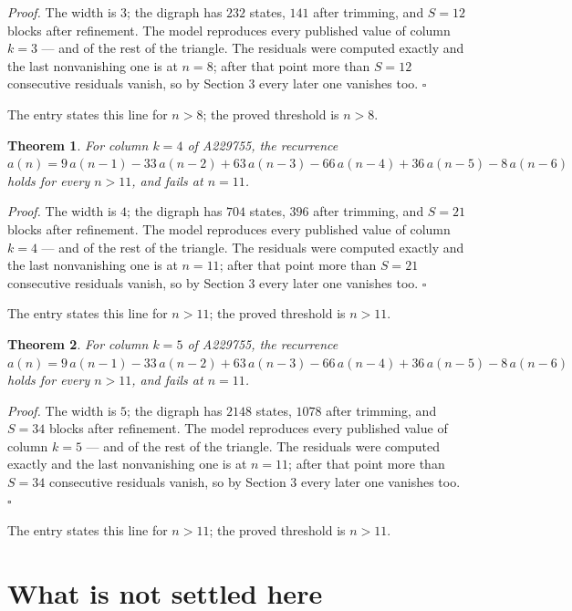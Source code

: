 \documentclass[11pt]{article}
\newtheorem{theorem}{Theorem}
\theoremstyle{definition}
\begin{document}
{\itshape Proof.} The width is $3$; the digraph has $232$ states, $141$ after trimming, and $S = 12$ blocks after refinement. The model reproduces every published value of column $k = 3$ --- and of the rest of the triangle. The residuals were computed exactly and the last nonvanishing one is at $n = 8$; after that point more than $S = 12$ consecutive residuals vanish, so by Section 3 every later one vanishes too. $\square$

The entry states this line for $n > 8$; the proved threshold is $n > 8$.

\begin{theorem} For column $k = 4$ of A229755, the recurrence $a(n) = 9\,a(n-1) - 33\,a(n-2) + 63\,a(n-3) - 66\,a(n-4) + 36\,a(n-5) - 8\,a(n-6)$ holds for every $n > 11$, and fails at $n = 11$.\end{theorem}

{\itshape Proof.} The width is $4$; the digraph has $704$ states, $396$ after trimming, and $S = 21$ blocks after refinement. The model reproduces every published value of column $k = 4$ --- and of the rest of the triangle. The residuals were computed exactly and the last nonvanishing one is at $n = 11$; after that point more than $S = 21$ consecutive residuals vanish, so by Section 3 every later one vanishes too. $\square$

The entry states this line for $n > 11$; the proved threshold is $n > 11$.

\begin{theorem} For column $k = 5$ of A229755, the recurrence $a(n) = 9\,a(n-1) - 33\,a(n-2) + 63\,a(n-3) - 66\,a(n-4) + 36\,a(n-5) - 8\,a(n-6)$ holds for every $n > 11$, and fails at $n = 11$.\end{theorem}

{\itshape Proof.} The width is $5$; the digraph has $2148$ states, $1078$ after trimming, and $S = 34$ blocks after refinement. The model reproduces every published value of column $k = 5$ --- and of the rest of the triangle. The residuals were computed exactly and the last nonvanishing one is at $n = 11$; after that point more than $S = 34$ consecutive residuals vanish, so by Section 3 every later one vanishes too. $\square$

The entry states this line for $n > 11$; the proved threshold is $n > 11$.

\section{What is not settled here}
\end{document}
